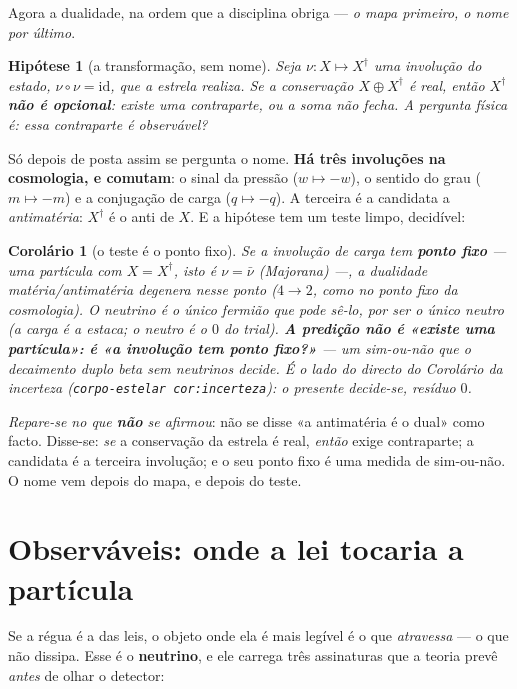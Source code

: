 \documentclass[11pt,a4paper]{article}
\newcommand{\code}[1]{\texttt{\small #1}}
\newtheorem{corolario}[teorema]{Corolário}
\newtheorem{hipotese}[teorema]{Hipótese}
\newcommand{\dg}{^{\dagger}}
\begin{document}
Agora a dualidade, na ordem que a disciplina obriga --- \emph{o mapa primeiro, o nome por último}.

\begin{hipotese}[a transformação, sem nome]\label{hip:dual}
Seja $\nu:X\mapsto X\dg$ uma involução do estado, $\nu\circ\nu=\mathrm{id}$, que a estrela realiza. Se a
conservação $X\oplus X\dg$ é real, então $X\dg$ \textbf{não é opcional}: existe uma contraparte, ou a soma
não fecha. A pergunta física é: \emph{essa contraparte é observável?}
\end{hipotese}

\noindent Só depois de posta assim se pergunta o nome. \textbf{Há três involuções na cosmologia, e
comutam}: o sinal da pressão ($w\mapsto-w$), o sentido do grau ($m\mapsto-m$) e a conjugação de carga
($q\mapsto-q$). A terceira é a candidata a \emph{antimatéria}: $X\dg$ é o anti de $X$. E a hipótese tem um
teste limpo, decidível:

\begin{corolario}[o teste é o ponto fixo]\label{cor:majorana}
Se a involução de carga tem \textbf{ponto fixo} --- uma partícula com $X=X\dg$, isto é $\nu=\bar\nu$
(Majorana) ---, a dualidade matéria/antimatéria degenera nesse ponto ($4\to2$, como no ponto fixo da
cosmologia). O neutrino é o \emph{único} fermião que \emph{pode} sê-lo, por ser o único neutro (a carga é a
estaca; o neutro é o $0$ do trial). \textbf{A predição não é «existe uma partícula»: é «a involução tem
ponto fixo?»} --- um sim-ou-não que o decaimento duplo beta sem neutrinos decide. É o lado do \emph{directo}
do Corolário da incerteza (\code{corpo-estelar cor:incerteza}): o presente decide-se, resíduo $0$.
\end{corolario}

\noindent \emph{Repare-se no que \textbf{não} se afirmou}: não se disse «a antimatéria é o dual» como
facto. Disse-se: \emph{se} a conservação da estrela é real, \emph{então} exige contraparte; a candidata é a
terceira involução; e o seu ponto fixo é uma medida de sim-ou-não. O nome vem depois do mapa, e depois do
teste.

\section{Observáveis: onde a lei tocaria a partícula}\label{sec:observaveis}

Se a régua é a das leis, o objeto onde ela é mais legível é o que \emph{atravessa} --- o que não dissipa.
Esse é o \textbf{neutrino}, e ele carrega três assinaturas que a teoria prevê \emph{antes} de olhar o
detector:
\end{document}
